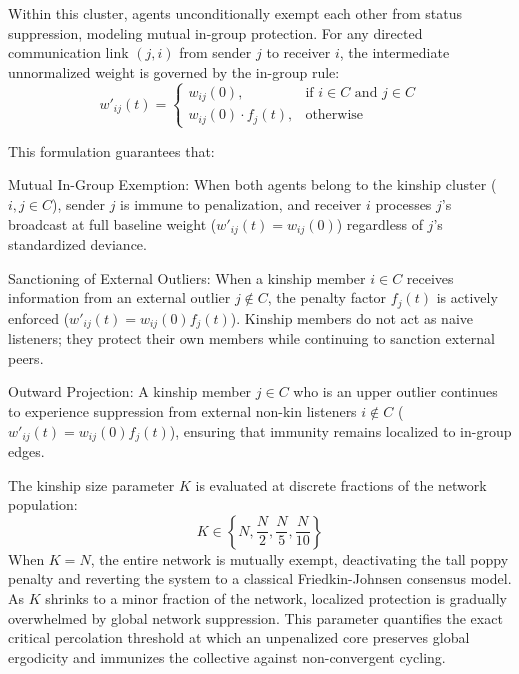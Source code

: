 Within this cluster, agents unconditionally exempt each other from status suppression, modeling mutual in-group protection\cite{degroot1974reaching,acemoglu2013opinion}. For any directed communication link $(j, i)$ from sender $j$ to receiver $i$, the intermediate unnormalized weight is governed by the in-group rule\cite{acemoglu2013opinion}: $$w'_{ij}(t) = \begin{cases} w_{ij}(0), & \text{if } i \in C \text{ and } j \in C \\ w_{ij}(0) \cdot f_j(t), & \text{otherwise} \end{cases}$$

This formulation guarantees that\cite{acemoglu2013opinion}:

Mutual In-Group Exemption: When both agents belong to the kinship cluster ($i, j \in C$), sender $j$ is immune to penalization, and receiver $i$ processes $j$'s broadcast at full baseline weight ($w'_{ij}(t) = w_{ij}(0)$) regardless of $j$'s standardized deviance\cite{degroot1974reaching,acemoglu2013opinion}.

Sanctioning of External Outliers: When a kinship member $i \in C$ receives information from an external outlier $j \notin C$, the penalty factor $f_j(t)$ is actively enforced ($w'_{ij}(t) = w_{ij}(0) f_j(t)$)\cite{acemoglu2013opinion}. Kinship members do not act as naive listeners; they protect their own members while continuing to sanction external peers\cite{acemoglu2013opinion}.

Outward Projection: A kinship member $j \in C$ who is an upper outlier continues to experience suppression from external non-kin listeners $i \notin C$ ($w'_{ij}(t) = w_{ij}(0) f_j(t)$), ensuring that immunity remains localized to in-group edges\cite{acemoglu2013opinion}.

The kinship size parameter $K$ is evaluated at discrete fractions of the network population: $$K \in \left\{ N, \frac{N}{2}, \frac{N}{5}, \frac{N}{10} \right\}$$ When $K = N$, the entire network is mutually exempt, deactivating the tall poppy penalty and reverting the system to a classical Friedkin-Johnsen consensus model\cite{degroot1974reaching}. As $K$ shrinks to a minor fraction of the network, localized protection is gradually overwhelmed by global network suppression\cite{degroot1974reaching}. This parameter quantifies the exact critical percolation threshold at which an unpenalized core preserves global ergodicity and immunizes the collective against non-convergent cycling\cite{degroot1974reaching,hajnal1958weak}.

